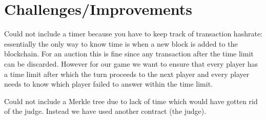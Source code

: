 \documentclass{article}
\begin{document}
\section {Challenges/Improvements}
Could not include a timer because you have to keep track of transaction hashrate:
essentially the only way to know time is when a new block is added to the blockchain. For an auction this is fine since any transaction after the time limit can be discarded. However for our game we want to ensure that every player has a time limit after which the turn proceeds to the next player and every player needs to know which player failed to answer within the time limit. 

Could not include a Merkle tree due to lack of time which would have gotten rid of the judge. Instead we have used another contract (the judge).
\end{document}

